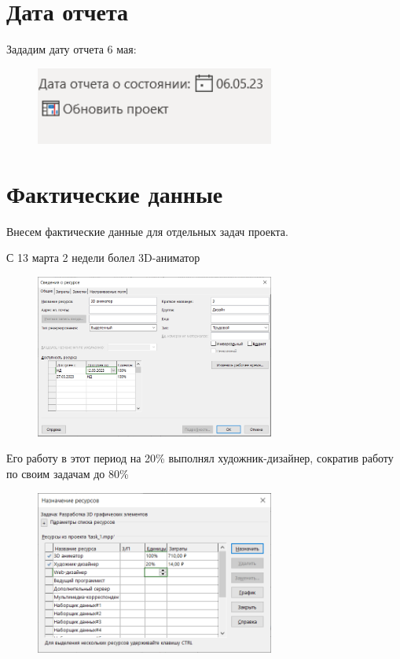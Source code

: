 \section*{Дата отчета}

Зададим дату отчета 6 мая:

\begin{figure}[H]
	\begin{center}
		\includegraphics[width=0.7\textwidth]{imgs/task_1_0.png}
	\end{center}
\end{figure}

\section*{Фактические данные}

Внесем фактические данные для отдельных задач проекта.

С 13 марта 2 недели болел 3D-аниматор

\begin{figure}[H]
	\begin{center}
		\includegraphics[width=0.7\textwidth]{imgs/task_1_1.png}
	\end{center}
\end{figure}

Его работу в этот период на 20\% выполнял художник-дизайнер, сократив работу по своим задачам до 80\%

\begin{figure}[H]
	\begin{center}
		\includegraphics[width=0.7\textwidth]{imgs/task_1_2.png}
	\end{center}
\end{figure}

